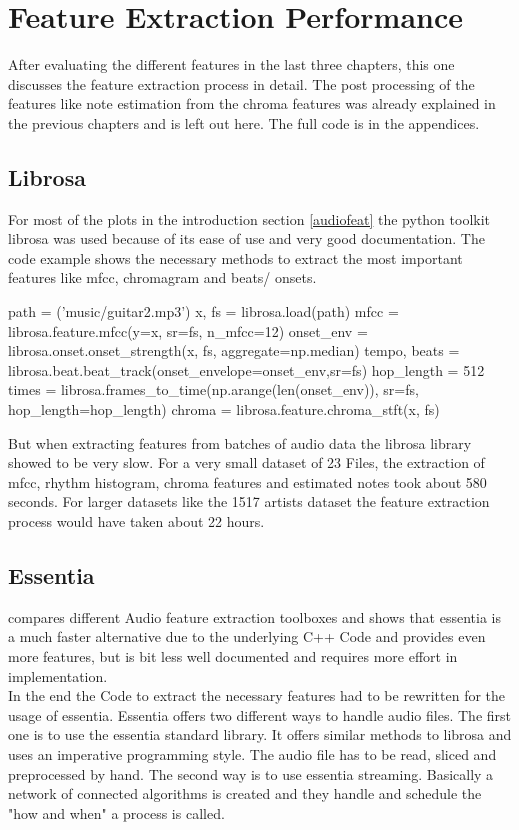 \section{Feature Extraction Performance}

After evaluating the different features in the last three chapters, this one discusses the feature extraction process in detail. The post processing of the features like note estimation from the chroma features was already explained in the previous chapters and is left out here. The full code is in the appendices. 

\subsection{Librosa}

For most of the plots in the introduction section \ref{audiofeat} the python toolkit librosa was used because of its ease of use and very good documentation. The code example shows the necessary methods to extract the most important features like mfcc, chromagram and beats/ onsets.

\FloatBarrier
\begin{pythonCode}
path = ('music/guitar2.mp3')
x, fs = librosa.load(path)
mfcc = librosa.feature.mfcc(y=x, sr=fs, n_mfcc=12)
onset_env = librosa.onset.onset_strength(x, fs, aggregate=np.median)
tempo, beats = librosa.beat.beat_track(onset_envelope=onset_env,sr=fs)
hop_length = 512
times = librosa.frames_to_time(np.arange(len(onset_env)), sr=fs, hop_length=hop_length)
chroma = librosa.feature.chroma_stft(x, fs)
\end{pythonCode}	
\FloatBarrier

But when extracting features from batches of audio data the librosa library showed to be very slow. For a very small dataset of 23 Files, the extraction of mfcc, rhythm histogram, chroma features and estimated notes took about 580 seconds. 
For larger datasets like the 1517 artists dataset the feature extraction process would have taken about 22 hours. 

\subsection{Essentia}

\cite{audiofeattoolb} compares different Audio feature extraction toolboxes and shows that essentia is a much faster alternative due to the underlying C++ Code and provides even more features, but is bit less well documented and requires more effort in implementation.\\ 
In the end the Code to extract the necessary features had to be rewritten for the usage of essentia. Essentia offers two different ways to handle audio files. The first one is to use the essentia standard library. It offers similar methods to librosa and uses an imperative programming style. The audio file has to be read, sliced and preprocessed by hand. 
The second way is to use essentia streaming. Basically a network of connected algorithms is created and they handle and schedule the "how and when" a process is called.

